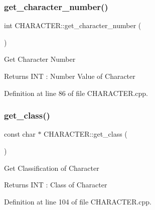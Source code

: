 \mbox{\label{class_c_h_a_r_a_c_t_e_r_a4bcf200b95bdbd7dd1bee5779acc8d96}} 
\subsubsection{\texorpdfstring{get\_character\_number()}{get\_character\_number()}}
{\footnotesize\ttfamily int C\+H\+A\+R\+A\+C\+T\+E\+R\+::get\+\_\+character\+\_\+number (\begin{DoxyParamCaption}{ }\end{DoxyParamCaption})}



Get Character Number 

\begin{DoxyReturn}{Returns}
I\+NT \+: Number Value of Character
\end{DoxyReturn}


Definition at line 86 of file C\+H\+A\+R\+A\+C\+T\+E\+R.\+cpp.

\mbox{\label{class_c_h_a_r_a_c_t_e_r_a82245a7d6d0c452402071dbea8d74171}} 
\subsubsection{\texorpdfstring{get\_class()}{get\_class()}}
{\footnotesize\ttfamily const char $\ast$ C\+H\+A\+R\+A\+C\+T\+E\+R\+::get\+\_\+class (\begin{DoxyParamCaption}{ }\end{DoxyParamCaption})}



Get Classification of Character 

\begin{DoxyReturn}{Returns}
I\+NT \+: Class of Character
\end{DoxyReturn}


Definition at line 104 of file C\+H\+A\+R\+A\+C\+T\+E\+R.\+cpp.

\mbox{\label{class_c_h_a_r_a_c_t_e_r_af6adb3c39e4d88546e976e99245264a1}} 
